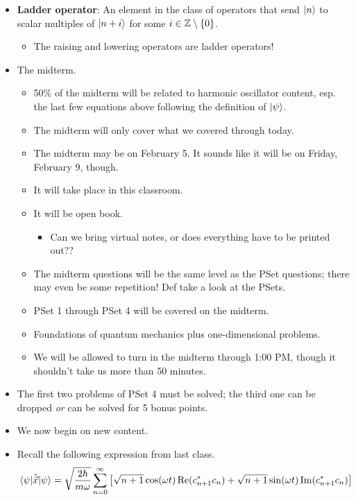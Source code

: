 \documentclass[../notes.tex]{subfiles}
\begin{document}
\begin{itemize}
    \item \textbf{Ladder operator}: An element in the class of operators that send $\ket{n}$ to scalar multiples of $\ket{n+i}$ for some $i\in\mathbb{Z}\setminus\{0\}$.
    \begin{itemize}
        \item The raising and lowering operators are ladder operators!
    \end{itemize}
    \item The midterm.
    \begin{itemize}
        \item 50\% of the midterm will be related to harmonic oscillator content, esp. the last few equations above following the definition of $\ket{\psi}$.
        \item The midterm will only cover what we covered through today.
        \item The midterm may be on February 5. It sounds like it will be on Friday, February 9, though.
        \item It will take place in this classroom.
        \item It will be open book.
        \begin{itemize}
            \item Can we bring virtual notes, or does everything have to be printed out??
        \end{itemize}
        \item The midterm questions will be the same level as the PSet questions; there may even be some repetition! Def take a look at the PSets.
        \item PSet 1 through PSet 4 will be covered on the midterm.
        \item Foundations of quantum mechanics plus one-dimensional problems.
        \item We will be allowed to turn in the midterm through 1:00 PM, though it shouldn't take us more than 50 minutes.
    \end{itemize}
    \item The first two problems of PSet 4 must be solved; the third one can be dropped \emph{or} can be solved for 5 bonus points.
    \item We now begin on new content.
    \item Recall the following expression from last class.
    \begin{equation*}
        \ev{\hat{\vec{x}}}{\psi} = \sqrt{\frac{2\hbar}{m\omega}}\sum_{n=0}^\infty\left[ \sqrt{n+1}\cos(\omega t)\re(c_{n+1}^*c_n)+\sqrt{n+1}\sin(\omega t)\im(c_{n+1}^*c_n) \right]

\end{equation*}
\end{itemize}
\end{document}
